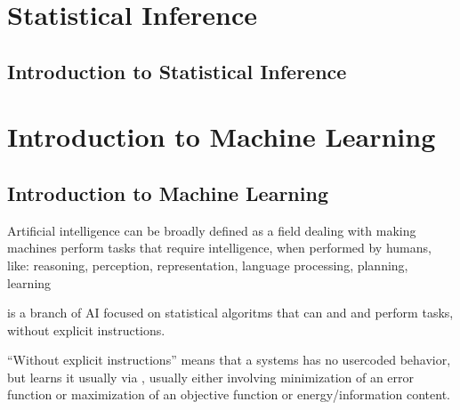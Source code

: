 \documentclass[letterpaper,10pt,english]{jupyterBook}
\begin{document}
\part{Statistical Inference}

\sphinxstepscope


\chapter{Introduction to Statistical Inference}
\label{\detokenize{ch/infer/intro:introduction-to-statistical-inference}}\label{\detokenize{ch/infer/intro:infer-intro}}\label{\detokenize{ch/infer/intro::doc}}
\sphinxstepscope


\part{Introduction to Machine Learning}

\sphinxstepscope


\chapter{Introduction to Machine Learning}
\label{\detokenize{ch/ml/intro:introduction-to-machine-learning}}\label{\detokenize{ch/ml/intro:ml-intro}}\label{\detokenize{ch/ml/intro::doc}}
\sphinxAtStartPar
Artificial intelligence can be broadly defined as a field dealing with making machines perform tasks that require intelligence, when performed by humans, like: reasoning, perception, representation, language processing, planning, learning

\sphinxAtStartPar
{} is a branch of AI focused on statistical algoritms that can  and  and perform tasks, without explicit instructions.%
\begin{footnote}[1]\sphinxAtStartFootnote
“Without explicit instructions” means that a systems has no user\sphinxhyphen{}coded behavior, but learns it usually via , usually either involving minimization of an error function or maximization of an objective function or energy/information content.
%
\end{footnote}
\end{document}
